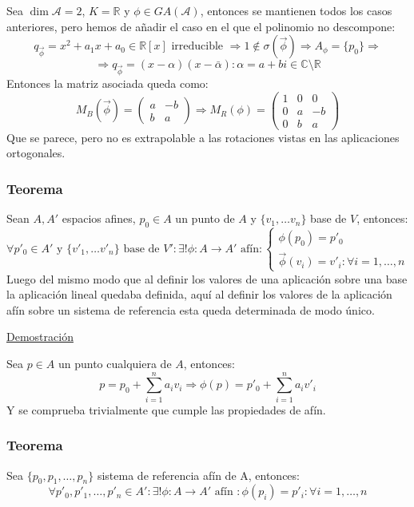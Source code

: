 \documentclass[10pt,a4paper,openright]{book}
\begin{document}
Sea $\dim \mathcal{A} = 2$, $K = \mathbb{R}$ y $\phi \in GA(\mathcal{A})$, entonces se mantienen todos los casos anteriores, pero hemos de añadir el caso en el que el polinomio no descompone:
$$q_{\vec{\phi}} = x^2 + a_1x + a_0 \in \mathbb{R}[x] \mbox{ irreducible } \Rightarrow 1 \notin \sigma(\vec{\phi}) \Rightarrow A_\phi = \{p_0\} \Rightarrow$$
$$ \Rightarrow q_{\vec{\phi}} = (x- \alpha)(x - \bar{\alpha}) : \alpha = a + bi \in \mathbb{C} \setminus \mathbb{R}$$
Entonces la matriz asociada queda como:
$$M_B (\vec{\phi}) = \begin{pmatrix}
a & -b \\ b & a
\end{pmatrix}\Rightarrow M_R (\phi) =  \left(\begin{array}{c|cc}
1  & 0 & 0 \\
\hline
0 & a &  -b \\
0 & b &  a
\end{array}
\right)$$
Que se parece, pero no es extrapolable a las rotaciones vistas en las aplicaciones ortogonales.

\subsubsection*{Teorema}
Sean $A, A'$ espacios afines, $p_0 \in A$ un punto de $A$ y $\{v_1, \ldots v_n\}$ base de $V$, entonces:
$$\forall p'_0 \in A' \mbox{ y }\{v'_1, \ldots v'_n\} \mbox{ base de }V':\exists ! \phi: A \to A'\mbox{ afín}: \begin{cases} \phi(p_0) = p'_0 \\ \vec{\phi} (v_i) = v'_i : \forall i = 1, \ldots, n \end{cases}$$
Luego del mismo modo que al definir los valores de una aplicación sobre una base la aplicación lineal quedaba definida, aquí al definir los valores de la aplicación afín sobre un sistema de referencia esta queda determinada de modo único.

\underline{Demostración}

Sea $p \in A $ un punto cualquiera de $A$, entonces:
$$p = p_0 + \sum_{i=1}^{n} a_i v_i \Rightarrow  \phi(p) = p'_0 + \sum_{i=1}^{n} a_i v'_i $$
Y se comprueba trivialmente que cumple las propiedades de afín.

\subsubsection*{Teorema}
Sea $\{p_0, p_1, \ldots, p_n\}$ sistema de referencia afín de A, entonces:
$$\forall p'_0, p'_1, \ldots, p'_n \in A': \exists! \phi: A \to A' \mbox{ afín }:\phi (p_i) = p'_i : \forall i = 1, \ldots, n$$
\end{document}

